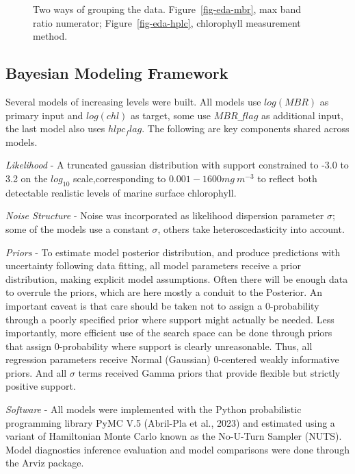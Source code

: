 \documentclass[
]{agujournal2019}
\begin{document}
\begin{figure}
\begin{minipage}{0.50\linewidth}
{}

\subcaption{\label{fig-eda-hplc}}

\end{minipage}%

\caption{\label{fig-eda}Two ways of grouping the data.
Figure~\ref{fig-eda-mbr}, max band ratio numerator;
Figure~\ref{fig-eda-hplc}, chlorophyll measurement method.}

\end{figure}%

\subsection{Bayesian Modeling
Framework}\label{bayesian-modeling-framework}

Several models of increasing levels were built. All models use
\(log(MBR)\) as primary input and \(log(chl)\) as target, some use
\(MBR\_flag\) as additional input, the last model also uses
\(hlpc_flag\). The following are key components shared across models.

\emph{Likelihood} - A truncated gaussian distribution with support
constrained to -3.0 to 3.2 on the \(log_{10}\) scale,corresponding to
\(0.001 - 1600 mg\ m^{-3}\) to reflect both detectable realistic levels
of marine surface chlorophyll.

\emph{Noise Structure} - Noise was incorporated as likelihood dispersion
parameter \(σ\); some of the models use a constant \(σ\), others take
heteroscedasticity into account.

\emph{Priors} - To estimate model posterior distribution, and produce
predictions with uncertainty following data fitting, all model
parameters receive a prior distribution, making explicit model
assumptions. Often there will be enough data to overrule the priors,
which are here mostly a conduit to the Posterior. An important caveat is
that care should be taken not to assign a 0-probability through a poorly
specified prior where support might actually be needed. Less
importantly, more efficient use of the search space can be done through
priors that assign 0-probability where support is clearly unreasonable.
Thus, all regression parameters receive Normal (Gaussian) 0-centered
weakly informative priors. And all \(σ\) terms received Gamma priors
that provide flexible but strictly positive support.

\emph{Software} - All models were implemented with the Python
probabilistic programming library PyMC V.5 (Abril-Pla et al., 2023) and
estimated using a variant of Hamiltonian Monte Carlo known as the
No-U-Turn Sampler (NUTS). Model diagnostics inference evaluation and
model comparisons were done through the Arviz package.
\end{document}
